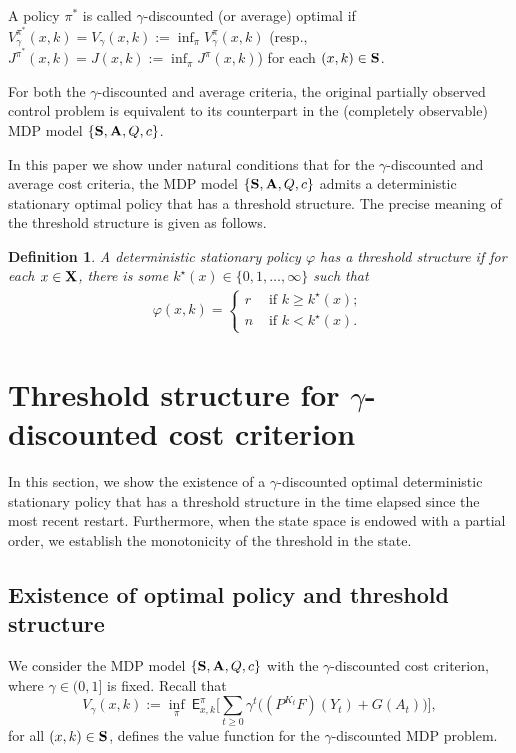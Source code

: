 \documentclass[letterpaper,10pt,conference]{ieeeconf}  %
\newtheorem{definition}{Definition}
\def\EE{\mathsf{E}}
\begin{document}
{A policy $\pi^\ast$ is called $\gamma$-discounted (or average) optimal if $V^{\pi^\ast}_\gamma(x,k)= V_\gamma(x,k):= \inf_{\pi} V^{\pi}_\gamma(x,k)$ (resp., $J^{\pi^\ast}(x,k)=J(x,k):=\inf_{\pi} J^\pi(x,k)$) for each $(x,k)\in {\bf S}$.} 



{For both the $\gamma$-discounted and average criteria},  the original partially observed control problem is equivalent 
to {its counterpart in the (completely observable) MDP model $\{{\bf S},{\bf A},Q,c\}$.} 



In this paper we show under natural conditions that for the $\gamma$-discounted and average cost criteria,  the MDP model $\{{\bf S},{\bf A},Q,c\}$ admits a deterministic stationary optimal policy that has a threshold structure. The precise meaning of the threshold structure is given as follows.
\begin{definition}
\label{Kostia2026Def01} A deterministic stationary policy $\varphi$ has a threshold structure if for each $x\in {\bf X}$, there is some $k^{\star}(x)\in\{0,1,\dots,\infty\}$ such that 
\begin{align}\label{Kostia2026Eqn11}
\varphi(x,k)=\begin{cases}
r & \mbox{ if $k\ge k^{\star}(x)$; }\\
n & \mbox{ if $k<k^{\star}(x)$.} 
\end{cases}
\end{align} 
\end{definition}


\section{Threshold structure for $\gamma$-discounted cost criterion}

In this section, we show the existence of a $\gamma$-discounted optimal deterministic stationary policy that has a threshold structure in the time elapsed since the most recent restart. Furthermore, when the state space is endowed with a partial order, we establish the monotonicity of the threshold in the state. 


\subsection{Existence of optimal policy and threshold structure}
{We consider the MDP model $\{{\bf S},{\bf A},Q,c\}$ with the $\gamma$-discounted cost criterion, where $\gamma\in(0,1]$ is fixed. Recall that 
\[
V_\gamma(x,k):=\inf_{\pi}\ \EE^\pi_{x,k}\Big[\sum_{t\ge 0}\gamma^t\big((P^{K_t}F)(Y_t)+G(A_t)\big)\Big],
\]
for all $(x,k)\in {\bf S}$, defines the value function for the $\gamma$-discounted MDP problem.} 
 
\end{document}
